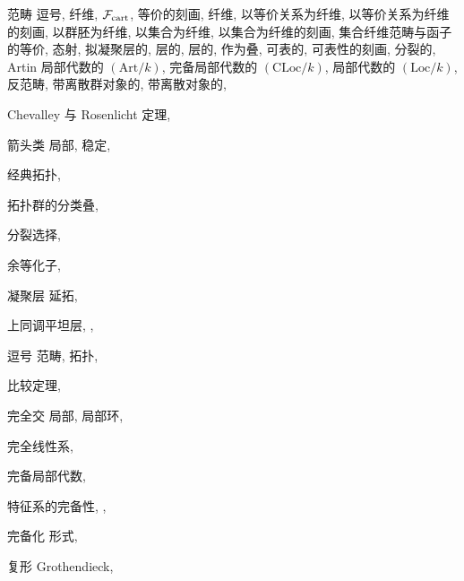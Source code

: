 \begin{theindex}
\item 范畴
\subitem 逗号, 
\subitem 纤维, 
\subsubitem $\mathcal F_{\mathrm{cart}}$, 
\subsubitem 等价的刻画, 
\subsubitem 纤维, 
\subsubitem 以等价关系为纤维, 
\subsubitem 以等价关系为纤维的刻画, 
\subsubitem 以群胚为纤维, 
\subsubitem 以集合为纤维, 
\subsubitem 以集合为纤维的刻画, 
\subsubitem 集合纤维范畴与函子的等价, 
\subsubitem 态射, 
\subsubitem 拟凝聚层的, 
\subsubitem 层的, 
\subsubitem 层的, 作为叠, 
\subsubitem 可表的, 
\subsubitem 可表性的刻画, 
\subsubitem 分裂的, 
\subitem Artin 局部代数的 $(\mathrm{Art}/k)$, 
\subitem 完备局部代数的 $(\mathrm{CLoc}/k)$, 
\subitem 局部代数的 $(\mathrm{Loc}/k)$, 
\subitem 反范畴, 
\subitem 带离散群对象的, 
\subitem 带离散对象的, 
\item Chevalley 与 Rosenlicht 定理, 
\item 箭头类
\subitem 局部, 
\subitem 稳定, 
\item 经典拓扑, 
\item 拓扑群的分类叠, 
\item 分裂选择, 
\item 余等化子, 
\item 凝聚层
\subitem 延拓, 
\item 上同调平坦层, , 
\item 逗号
\subitem 范畴, 
\subitem 拓扑, 
\item 比较定理, 
\item 完全交
\subitem 局部, 
\subitem 局部环, 
\item 完全线性系, 
\item 完备局部代数, 
\item 特征系的完备性, , 
\item 完备化
\subitem 形式, 
\item 复形
\subitem Grothendieck, 

\end{theindex}
